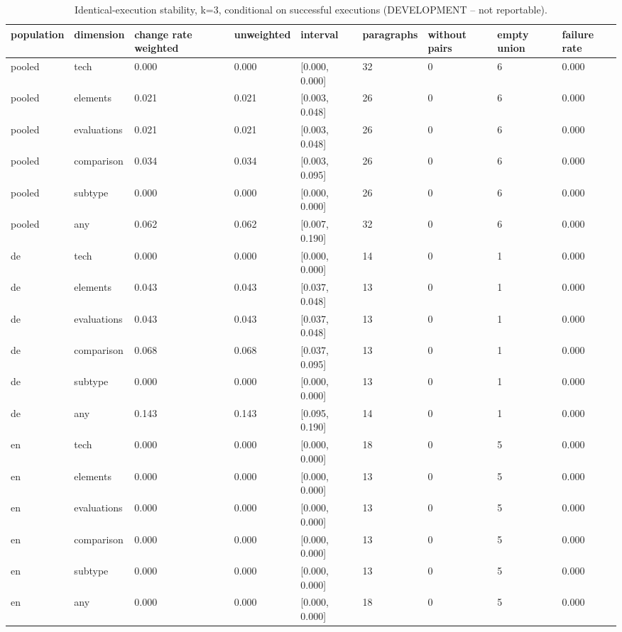 \begin{table}[htbp]
\centering
\small
\begin{tabular}{lllllllll}
\toprule
\textbf{population} & \textbf{dimension} & \textbf{change rate weighted} & \textbf{unweighted} & \textbf{interval} & \textbf{paragraphs} & \textbf{without pairs} & \textbf{empty union} & \textbf{failure rate} \\
\midrule
pooled & tech & 0.000 & 0.000 & [0.000, 0.000] & 32 & 0 & 6 & 0.000 \\
pooled & elements & 0.021 & 0.021 & [0.003, 0.048] & 26 & 0 & 6 & 0.000 \\
pooled & evaluations & 0.021 & 0.021 & [0.003, 0.048] & 26 & 0 & 6 & 0.000 \\
pooled & comparison & 0.034 & 0.034 & [0.003, 0.095] & 26 & 0 & 6 & 0.000 \\
pooled & subtype & 0.000 & 0.000 & [0.000, 0.000] & 26 & 0 & 6 & 0.000 \\
pooled & any & 0.062 & 0.062 & [0.007, 0.190] & 32 & 0 & 6 & 0.000 \\
de & tech & 0.000 & 0.000 & [0.000, 0.000] & 14 & 0 & 1 & 0.000 \\
de & elements & 0.043 & 0.043 & [0.037, 0.048] & 13 & 0 & 1 & 0.000 \\
de & evaluations & 0.043 & 0.043 & [0.037, 0.048] & 13 & 0 & 1 & 0.000 \\
de & comparison & 0.068 & 0.068 & [0.037, 0.095] & 13 & 0 & 1 & 0.000 \\
de & subtype & 0.000 & 0.000 & [0.000, 0.000] & 13 & 0 & 1 & 0.000 \\
de & any & 0.143 & 0.143 & [0.095, 0.190] & 14 & 0 & 1 & 0.000 \\
en & tech & 0.000 & 0.000 & [0.000, 0.000] & 18 & 0 & 5 & 0.000 \\
en & elements & 0.000 & 0.000 & [0.000, 0.000] & 13 & 0 & 5 & 0.000 \\
en & evaluations & 0.000 & 0.000 & [0.000, 0.000] & 13 & 0 & 5 & 0.000 \\
en & comparison & 0.000 & 0.000 & [0.000, 0.000] & 13 & 0 & 5 & 0.000 \\
en & subtype & 0.000 & 0.000 & [0.000, 0.000] & 13 & 0 & 5 & 0.000 \\
en & any & 0.000 & 0.000 & [0.000, 0.000] & 18 & 0 & 5 & 0.000 \\
\bottomrule
\end{tabular}
\caption{Identical-execution stability, k=3, conditional on successful executions (DEVELOPMENT -- not reportable).}
\end{table}
